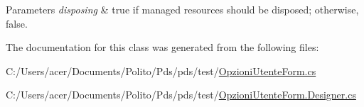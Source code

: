 \begin{DoxyParams}{Parameters}
{\em disposing} & true if managed resources should be disposed; otherwise, false.\\
\hline
\end{DoxyParams}


The documentation for this class was generated from the following files\+:\begin{DoxyCompactItemize}
\item 
C\+:/\+Users/acer/\+Documents/\+Polito/\+Pds/pds/test/\hyperlink{_opzioni_utente_form_8cs}{Opzioni\+Utente\+Form.\+cs}\item 
C\+:/\+Users/acer/\+Documents/\+Polito/\+Pds/pds/test/\hyperlink{_opzioni_utente_form_8_designer_8cs}{Opzioni\+Utente\+Form.\+Designer.\+cs}\end{DoxyCompactItemize}
